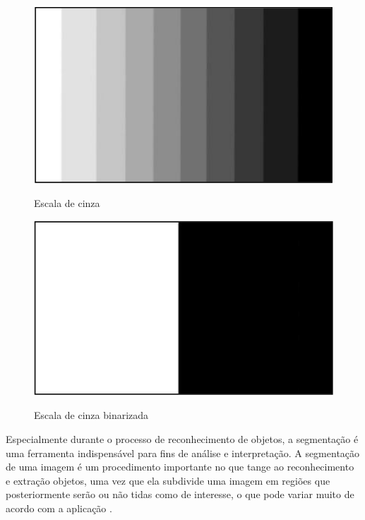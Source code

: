 \begin{figure}[h!]
    \centering
    \caption{Escala de cinza}
    \includegraphics[scale=0.22]{figuras/escala_cinza.png} 
    \fonte{}%
    \label{fig:escalacinza}
    \centering
\end{figure}

\begin{figure}[h!]
    \centering
    \caption{Escala de cinza binarizada}
    \includegraphics[scale=0.22]{figuras/escala_binarizada.png} 
    \fonte{}%
    \label{fig:escalabinarizada}
    \centering
\end{figure}

Especialmente durante o processo de reconhecimento de objetos, 
a segmentação é uma ferramenta indispensável para fins de análise e interpretação.
A segmentação de uma imagem é um procedimento importante no que tange
ao reconhecimento e extração objetos, uma vez que ela subdivide uma imagem em regiões que
posteriormente serão ou não tidas como de interesse, o que pode variar muito de
acordo com a aplicação \cite[p. 6]{gonzalez2010}.

